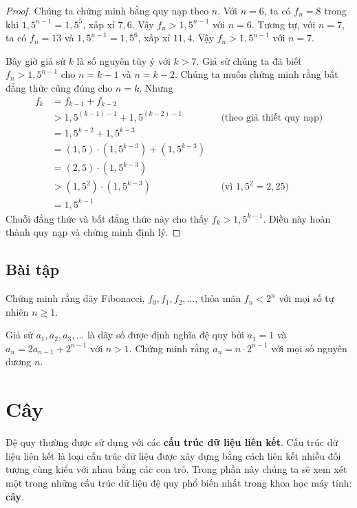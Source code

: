 \begin{proof}
Chúng ta chứng minh bằng quy nạp theo $n$. Với $n = 6$, ta có $f_n = 8$ trong khi $1{,}5^{n-1} = 1{,}5^5$, xấp xỉ $7{,}6$. Vậy $f_n > 1{,}5^{n-1}$ với $n = 6$. Tương tự, với $n = 7$, ta có $f_n = 13$ và $1{,}5^{n-1} = 1{,}5^6$, xấp xỉ $11{,}4$. Vậy $f_n > 1{,}5^{n-1}$ với $n = 7$.

Bây giờ giả sử $k$ là số nguyên tùy ý với $k > 7$. Giả sử chúng ta đã biết $f_n > 1{,}5^{n-1}$ cho $n = k - 1$ và $n = k - 2$. Chúng ta muốn chứng minh rằng bất đẳng thức cũng đúng cho $n = k$. Nhưng
\begin{align*}
f_k &= f_{k-1} + f_{k-2} \\
&> 1{,}5^{(k-1)-1} + 1{,}5^{(k-2)-1} && \text{(theo giả thiết quy nạp)}\\
&= 1{,}5^{k-2} + 1{,}5^{k-3} \\
&= (1{,}5) \cdot (1{,}5^{k-3}) + (1{,}5^{k-3}) \\
&= (2{,}5) \cdot (1{,}5^{k-3}) \\
&> (1{,}5^2) \cdot (1{,}5^{k-3}) && \text{(vì } 1{,}5^2 = 2{,}25\text{)}\\
&= 1{,}5^{k-1}
\end{align*}
Chuỗi đẳng thức và bất đẳng thức này cho thấy $f_k > 1{,}5^{k-1}$. Điều này hoàn thành quy nạp và chứng minh định lý.
\end{proof}

\subsection*{Bài tập}
\begin{exercise}
Chứng minh rằng dãy Fibonacci, $f_0, f_1, f_2, \ldots$, thỏa mãn $f_n < 2^n$ với mọi số tự nhiên $n \geq 1$.
\end{exercise}

\begin{exercise}
Giả sử $a_1, a_2, a_3, \ldots$ là dãy số được định nghĩa đệ quy bởi $a_1 = 1$ và $a_n = 2a_{n-1} + 2^{n-1}$ với $n > 1$. Chứng minh rằng $a_n = n \cdot 2^{n-1}$ với mọi số nguyên dương $n$.
\end{exercise}

\section{Cây}

Đệ quy thường được sử dụng với các \textbf{cấu trúc dữ liệu liên kết}. Cấu trúc dữ liệu liên kết là loại cấu trúc dữ liệu được xây dựng bằng cách liên kết nhiều đối tượng cùng kiểu với nhau bằng các con trỏ. Trong phần này chúng ta sẽ xem xét một trong những cấu trúc dữ liệu đệ quy phổ biến nhất trong khoa học máy tính: \textbf{cây}.

